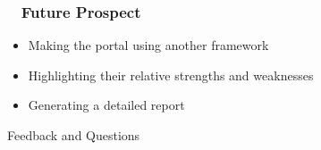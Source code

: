 \documentclass{beamer}
\begin{document}
\begin{frame}
\frametitle{ ~ Future Prospect} 
\begin{itemize}
\item{Making the portal using another framework}
\item{Highlighting their relative strengths and weaknesses}
\item{Generating a detailed report}
\end{itemize}
\end{frame}



\begin{frame}
\Huge{Feedback and Questions}
\end{frame}

\end{document}
